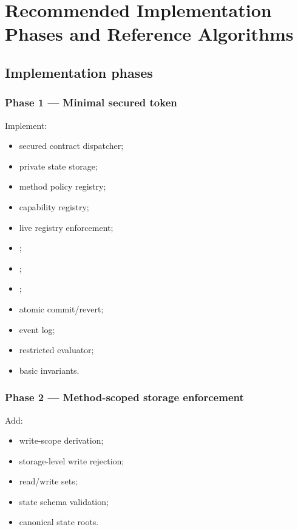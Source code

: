 \section{Recommended Implementation Phases and Reference Algorithms}

\subsection{Implementation phases}

\subsubsection{Phase 1 --- Minimal secured token}

Implement:

\begin{itemize}
  \item secured contract dispatcher;
  \item private state storage;
  \item method policy registry;
  \item capability registry;
  \item live registry enforcement;
  \item {};
  \item {};
  \item {};
  \item atomic commit/revert;
  \item event log;
  \item restricted \PeTTa{} evaluator;
  \item basic invariants.
\end{itemize}

\subsubsection{Phase 2 --- Method-scoped storage enforcement}

Add:

\begin{itemize}
  \item write-scope derivation;
  \item storage-level write rejection;
  \item read/write sets;
  \item state schema validation;
  \item canonical state roots.
\end{itemize}

